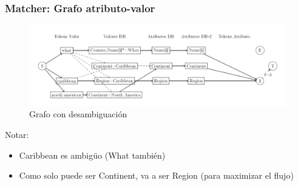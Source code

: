 


    

\begin{frame}
\frametitle{Matcher: Grafo atributo-valor}
\begin{figure}
  \centering
    \includegraphics[scale=.43]{graficos/presentacion/ejemplo-grafo-2}
    \caption{Grafo con desambiguación}
\end{figure}

Notar:
  \begin{itemize}
    \item Caribbean es ambigüo (What también)
    \item Como  solo puede ser Continent,  va a ser Region (para maximizar el flujo)
  \end{itemize}
\end{frame}

